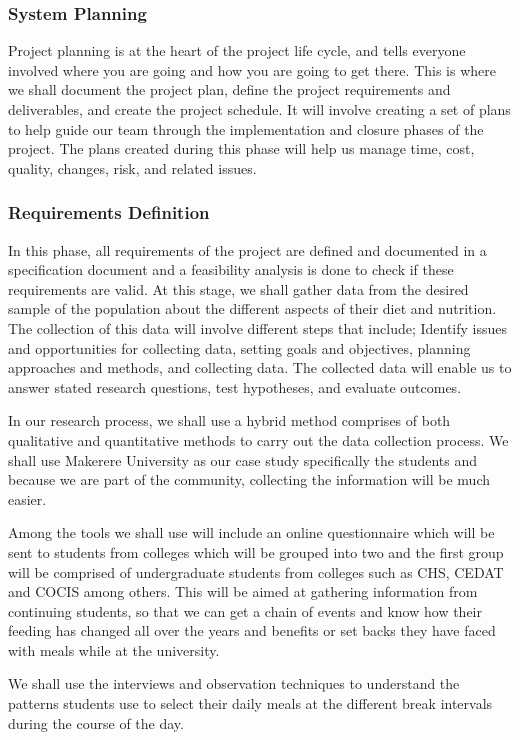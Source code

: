 \documentclass{article}
\begin{document}
\subsubsection{System Planning}
Project planning is at the heart of the project life cycle, and tells everyone involved where you are going and how you are going to get there. This is where we shall document the project plan, define the project requirements and deliverables, and create the project schedule. It will involve creating a set of plans to help guide our team through the implementation and closure phases of the project. The plans created during this phase will help us manage time, cost, quality, changes, risk, and related issues. 

\subsubsection{Requirements Definition}
In this phase, all requirements of the project are defined and documented in a specification document and a feasibility analysis is done to check if these requirements are valid. At this stage, we shall gather data from the desired sample of the population about the different aspects of their diet and nutrition. The collection of this data will involve different steps that include; Identify issues and opportunities for collecting data, setting goals and objectives, planning approaches and methods, and collecting data. The collected data will enable us to answer stated research questions, test hypotheses, and evaluate outcomes.

In our research process, we shall use a hybrid method comprises of both qualitative and quantitative methods to carry out the data collection process. We shall use Makerere University as our case study specifically the students and because we are part of the community, collecting the information will be much easier.   

Among the tools we shall use will include an online questionnaire which will be sent to students from colleges which will be grouped into two and the first group will be comprised of undergraduate students from colleges such as CHS, CEDAT and COCIS among others. This will be aimed at gathering information from continuing students, so that we can get a chain of events and know how their feeding has changed all over the years and benefits or set backs they have faced with meals while at the university.

We shall use the interviews and observation techniques to understand the patterns students use to select their daily meals at the different break intervals during the course of the day.
\end{document}
